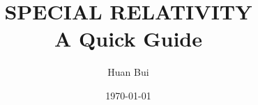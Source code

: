 \documentclass[a4paper,11pt]{article}
\numberwithin{equation}{section}
\begin{document}
\begin{titlepage}\centering
 \clearpage
 \title{\textsc{\bf{SPECIAL RELATIVITY}}\\\smallskip A Quick Guide\\}
 \author{\bigskip Huan Bui}
 \date{\today}
 \maketitle
 \thispagestyle{empty}
\end{titlepage}

%
 
 
 
% 
%
 
\end{document}
